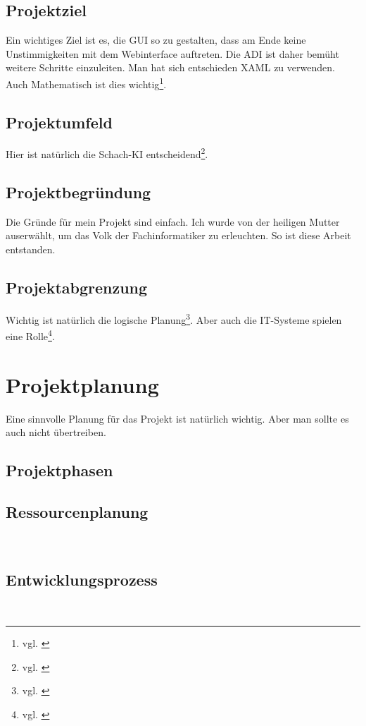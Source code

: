 \documentclass[11pt,toc=sectionentrywithoutdots, headheight=44pt, headings=optiontoheadandtoc, hyperfootnotes=false]{scrartcl}
\begin{document}
\subsection{Projektziel}
Ein wichtiges Ziel ist es, die \acs{GUI} so zu gestalten, dass am Ende keine Unstimmigkeiten mit dem 
Webinterface auftreten. Die \acs{ADI} ist daher bemüht weitere Schritte einzuleiten. Man hat sich entschieden \acs{XAML} zu verwenden. Auch Mathematisch ist dies wichtig\footnote{vgl. \cite{GeraldTeschl2008}}.

\subsection{Projektumfeld}
Hier ist natürlich die Schach-KI entscheidend\footnote{vgl. \cite{Schrepel2011}}.

\subsection{Projektbegründung}
Die Gründe für mein Projekt sind einfach. Ich wurde von der heiligen Mutter auserwählt,
um das Volk der Fachinformatiker zu erleuchten. So ist diese Arbeit entstanden.

\subsection{Projektabgrenzung}
Wichtig ist natürlich die logische Planung\footnote{vgl. \cite{Weigel2015}}.%
Aber auch die IT-Systeme spielen eine Rolle\footnote{vgl. \cite{Gettner2015}}.

\section{Projektplanung}
Eine sinnvolle Planung für das Projekt ist natürlich wichtig. Aber man sollte es auch nicht übertreiben.

\subsection{Projektphasen}
\blindtext

\subsection{Ressourcenplanung}
\blindtext\

\subsection{Entwicklungsprozess}
\blindtext\
\end{document}
